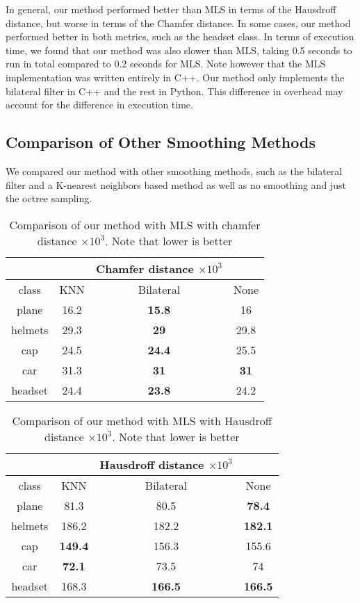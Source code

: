 In general, our method performed better than MLS in terms of the Hausdroff distance, but worse in terms of the Chamfer distance.
In some cases, our method performed better in both metrics, such as the headset class.
In terms of execution time, we found that our method was also slower than MLS, taking 0.5 seconds to run in total compared to 0.2 seconds for MLS.
Note however that the MLS implementation was written entirely in C++. Our method only implements the bilateral filter in C++ and the rest in Python. 
This difference in overhead may account for the difference in execution time.

\subsection{Comparison of Other Smoothing Methods}

We compared our method with other smoothing methods, such as the bilateral filter and a K-nearest neighbors based method as well as no smoothing and just the octree sampling.

\begin{table}[H]
\centering
\begin{tabular}{cccc}
	&  & Chamfer distance $\times 10^3$ &\\
	\hline
	class & KNN & Bilateral & None\\
	\hline
	plane & {16.2} & \textbf{15.8} & {16} \\ 
	helmets & {29.3} & \textbf{29} & {29.8} \\
	cap & {24.5} & \textbf{24.4} & {25.5}\\  
	car & {31.3} & \textbf{31} & \textbf{31}\\  
	headset & {24.4} & \textbf{23.8} & {24.2} \\
\end{tabular}
\caption{Comparison of our method with MLS with chamfer distance $\times 10^3$. Note that lower is better}
\end{table}

\begin{table}[H]
\centering
\begin{tabular}{cccc}
	&  & Hausdroff distance $\times 10^3$ &\\
	\hline
	class & KNN & Bilateral & None\\
	\hline
	plane & 81.3 & {80.5} & \textbf{78.4} \\ 
	helmets & 186.2 &  {182.2} & \textbf{182.1}\\
	cap & \textbf{149.4} & {156.3} & {155.6}\\ 
	car & \textbf{72.1} & {73.5} & {74}\\  
	headset & 168.3 & \textbf{166.5} & \textbf{166.5}\\
\end{tabular}
\caption{Comparison of our method with MLS with Hausdroff distance $\times 10^3$. Note that lower is better}
\end{table}

